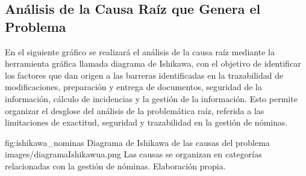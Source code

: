 \subsection{Análisis de la Causa Raíz que Genera el Problema}

En el siguiente gráfico se realizará el análisis de la causa raíz mediante la herramienta gráfica llamada diagrama de Ishikawa, 
con el objetivo de identificar los factores que dan origen a las barreras identificadas en la trazabilidad de modificaciones, 
preparación y entrega de documentos, seguridad de la información, cálculo de incidencias y la gestión de la información. 
Esto permite organizar el desglose del análisis de la problemática raíz, referida a las limitaciones de exactitud, 
seguridad y trazabilidad en la gestión de nóminas.

\vspace{0.3cm}

\par\medskip
\noindent
\figuraEnTexto
    {fig:ishikawa_nominas}
    {Diagrama de Ishikawa de las causas del problema}
    {images/diagramaIshikawua.png}
    {Las causas se organizan en categorías relacionadas
    con la gestión de nóminas. Elaboración propia.}
\par\medskip